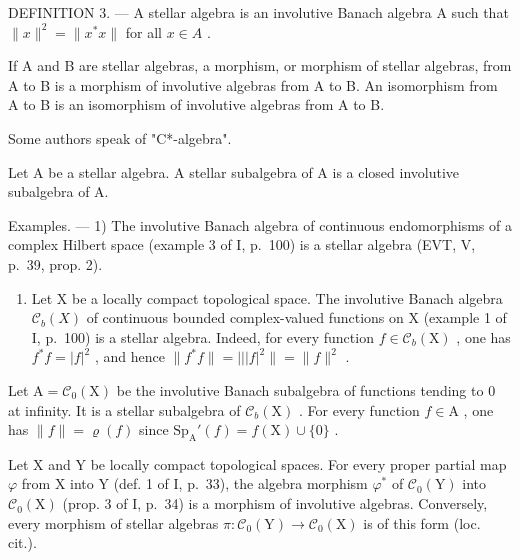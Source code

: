 DEFINITION 3. --- A stellar algebra is an involutive Banach algebra A such that \(\|x\|^{2}=\|x^{*}x\|\) for all \(x\in A\) .

If A and B are stellar algebras, a morphism, or morphism of stellar algebras, from A to B is a morphism of involutive algebras from A to B. An isomorphism from A to B is an isomorphism of involutive algebras from A to B.

Some authors speak of "C*-algebra".

Let A be a stellar algebra. A stellar subalgebra of A is a closed involutive subalgebra of A.

Examples. --- 1) The involutive Banach algebra of continuous endomorphisms of a complex Hilbert space (example 3 of I, p.~100) is a stellar algebra (EVT, V, p.~39, prop. 2).

\begin{enumerate}
\def\labelenumi{\arabic{enumi})}
\setcounter{enumi}{1}
\tightlist
\item
  Let X be a locally compact topological space. The involutive Banach algebra \(\mathcal{C}_{b}(X)\) of continuous bounded complex-valued functions on X (example 1 of I, p.~100) is a stellar algebra. Indeed, for every function \(f \in \mathcal{C}_b(\mathrm{X})\) , one has \(f^*f = |f|^2\) , and hence \(\| f^*f \| = |||f|^2 \| = \| f\|^2\) .
\end{enumerate}

Let \(\mathrm{A} = \mathcal{C}_0(\mathrm{X})\) be the involutive Banach subalgebra of functions tending to 0 at infinity. It is a stellar subalgebra of \(\mathcal{C}_b(\mathrm{X})\) . For every function \(f \in \mathrm{A}\) , one has \(\| f \| = \varrho(f)\) since \(\mathrm{Sp}_{\mathrm{A}}'(f) = f(\mathrm{X}) \cup \{0\}\) .

Let X and Y be locally compact topological spaces. For every proper partial map \(\varphi\) from X into Y (def. 1 of I, p.~33), the algebra morphism \(\varphi^{*}\) of \(\mathcal{C}_{0}(\mathrm{Y})\) into \(\mathcal{C}_{0}(\mathrm{X})\) (prop. 3 of I, p.~34) is a morphism of involutive algebras. Conversely, every morphism of stellar algebras \(\pi\colon\mathcal{C}_{0}(\mathrm{Y})\to\mathcal{C}_{0}(\mathrm{X})\) is of this form (loc. cit.).

